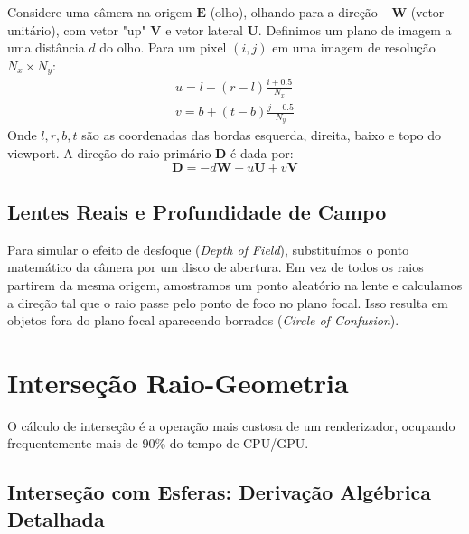 Considere uma câmera na origem $\mathbf{E}$ (olho), olhando para a direção $-\mathbf{W}$ (vetor unitário), com vetor "up" $\mathbf{V}$ e vetor lateral $\mathbf{U}$. Definimos um plano de imagem a uma distância $d$ do olho. Para um pixel $(i, j)$ em uma imagem de resolução $N_x \times N_y$:
\begin{align}
    u = l + (r-l)\frac{i+0.5}{N_x} \\
    v = b + (t-b)\frac{j+0.5}{N_y}
\end{align}
Onde $l, r, b, t$ são as coordenadas das bordas esquerda, direita, baixo e topo do viewport. A direção do raio primário $\mathbf{D}$ é dada por:
\begin{equation}
    \mathbf{D} = -d\mathbf{W} + u\mathbf{U} + v\mathbf{V}
\end{equation}

\subsection{Lentes Reais e Profundidade de Campo}

Para simular o efeito de desfoque (\textit{Depth of Field}), substituímos o ponto matemático da câmera por um disco de abertura. Em vez de todos os raios partirem da mesma origem, amostramos um ponto aleatório na lente e calculamos a direção tal que o raio passe pelo ponto de foco no plano focal. Isso resulta em objetos fora do plano focal aparecendo borrados (\textit{Circle of Confusion}).

\section{Interseção Raio-Geometria}

O cálculo de interseção é a operação mais custosa de um renderizador, ocupando frequentemente mais de 90\% do tempo de CPU/GPU.

\subsection{Interseção com Esferas: Derivação Algébrica Detalhada}

